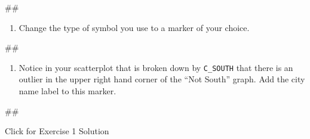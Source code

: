 \documentclass[
]{book}
\newenvironment{Shaded}{\begin{snugshade}}{\end{snugshade}}
\newcommand{\NormalTok}[1]{#1}
\providecommand{\tightlist}{%
  \setlength{\itemsep}{0pt}\setlength{\parskip}{0pt}}
\begin{document}
\begin{Shaded}
\begin{Highlighting}[]
\NormalTok{\#\#}
\end{Highlighting}
\end{Shaded}

\begin{enumerate}
\def\labelenumi{\arabic{enumi}.}
\setcounter{enumi}{4}
\tightlist
\item
  Change the type of symbol you use to a marker of your choice.
\end{enumerate}

\begin{Shaded}
\begin{Highlighting}[]
\NormalTok{\#\#}
\end{Highlighting}
\end{Shaded}

\begin{enumerate}
\def\labelenumi{\arabic{enumi}.}
\setcounter{enumi}{5}
\tightlist
\item
  Notice in your scatterplot that is broken down by \texttt{C\_SOUTH} that there is an outlier in the upper right hand corner of the ``Not South'' graph. Add the city name label to this marker.
\end{enumerate}

\begin{Shaded}
\begin{Highlighting}[]
\NormalTok{\#\#}
\end{Highlighting}
\end{Shaded}

{Click for Exercise 1 Solution}
\end{document}
